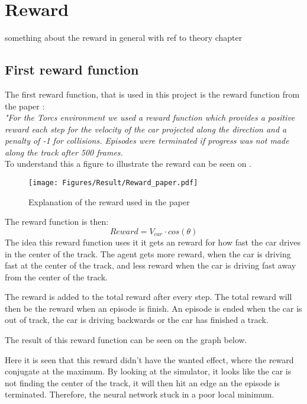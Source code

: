 \section{Reward}\label{sectionReward}
something about the reward in general with ref to theory chapter

\subsection*{First reward function}
The first reward function, that is used in this project is the reward function from the paper \cite{DBLP:journals/corr/LillicrapHPHETS15}: \\
\textit{"For the Torcs environment we used a reward function which provides a positive reward each step for the velocity of the car projected along the direction and a penalty of -1 for collisions. Episodes were terminated if progress was not made along the track after 500 frames.}\\
To understand this a figure to illustrate the reward can be seen on .

\begin{figure}[H]
	\centering
	\texttt{[image: Figures/Result/Reward\_paper.pdf]}
	\caption{Explanation of the reward used in the paper \cite{DBLP:journals/corr/LillicrapHPHETS15} }
	\label{fig:Reward_paper}
\end{figure}

The reward function is then:
\begin{equation}
Reward = V_{car} \cdot cos(\theta) 
\end{equation}
The idea this reward function uses it it gets an reward for how fast the car drives in the center of the track. The agent gets more reward, when the car is driving fast at the center of the track, and less reward when the car is driving fast away from the center of the track. 

The reward is added to the total reward after every step. The total reward will then be the reward when an episode is finish. An episode is ended when the car is out of track, the car is driving backwards or the car has finished a track. 

The result of this reward function can be seen on the graph below. 

Here it is seen that this reward didn't have the wanted effect, where the reward conjugate at the maximum. By looking at the simulator, it looks like the car is not finding the center of the track, it will then hit an edge an the episode is terminated. Therefore, the neural network stuck in a poor local minimum.  

